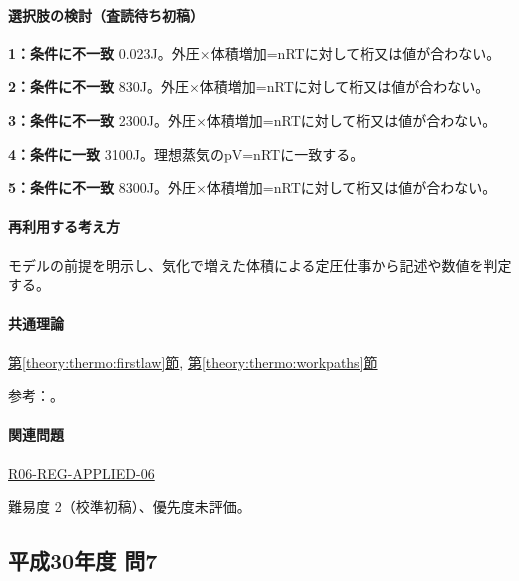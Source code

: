 \paragraph{選択肢の検討（査読待ち初稿）}\mbox{}\par

\noindent\textbf{1：条件に不一致} 0.023J。外圧×体積増加=nRTに対して桁又は値が合わない。\par

\noindent\textbf{2：条件に不一致} 830J。外圧×体積増加=nRTに対して桁又は値が合わない。\par

\noindent\textbf{3：条件に不一致} 2300J。外圧×体積増加=nRTに対して桁又は値が合わない。\par

\noindent\textbf{4：条件に一致} 3100J。理想蒸気のpV=\allowbreak{}nRTに一致する。\par

\noindent\textbf{5：条件に不一致} 8300J。外圧×体積増加=nRTに対して桁又は値が合わない。\par

\paragraph{再利用する考え方} モデルの前提を明示し、気化で増えた体積による定圧仕事から記述や数値を判定する。

\paragraph{共通理論} \hyperref[theory:thermo:firstlaw]{第\ref*{theory:thermo:firstlaw}節}, \hyperref[theory:thermo:workpaths]{第\ref*{theory:thermo:workpaths}節}

\par 参考：\cite{mit_thermo_firstlaw2008}。

\paragraph{関連問題} \hyperref[q:r06-reg-applied-06]{R06-REG-APPLIED-06}

\par 難易度 2（校準初稿）、優先度未評価。

\subsection{平成30年度 問7}
\label{q:h30-reg-applied-07}

